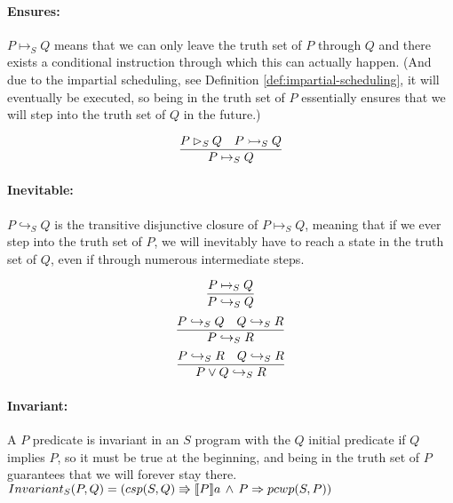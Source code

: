 \paragraph{Ensures:}
$P \mapsto_S Q$ means that we can only leave the truth set of $P$ through $Q$ and there exists a conditional instruction through which this can actually happen. (And due to the impartial scheduling, see Definition \ref{def:impartial-scheduling}, it will eventually be executed, so being in the truth set of $P$ essentially ensures that we will step into the truth set of $Q$ in the future.)

\begin{equation}
    \label{eq:ensures}
    \infer{P \mapsto_S Q}{P \rhd_S Q & P \rightarrowtail_S Q}
\end{equation}

\paragraph{Inevitable:}
$P \hookrightarrow_S Q$ is the transitive disjunctive closure of $P \mapsto_S Q$, meaning that if we ever step into the truth set of $P$, we will inevitably have to reach a state in the truth set of $Q$, even if through numerous intermediate steps.

\begin{equation}
    \label{eq:leadsto-fromensures}
    \infer{P \hookrightarrow_S Q}{P \mapsto_S Q}
\end{equation}
\begin{equation}
    \label{eq:leadsto-transitivity}
    \infer{P \hookrightarrow_S R}{P \hookrightarrow_S Q & Q \hookrightarrow_S R}
\end{equation}
\begin{equation}
    \label{eq:leadsto-disjunctivity}
    \infer{P \lor Q \hookrightarrow_S R}{P \hookrightarrow_S R & Q \hookrightarrow_S R}
\end{equation}

\paragraph{Invariant:}
A $P$ predicate is invariant in an $S$ program with the $Q$ initial predicate if $Q$ implies $P$, so it must be true at the beginning, and being in the truth set of $P$ guarantees that we will forever stay there. \\
$Invariant_S(P, Q) = (csp(S, Q) \Rrightarrow \llbracket P \rrbracket a \, \land \, P \Rightarrow pcwp(S, P))$

